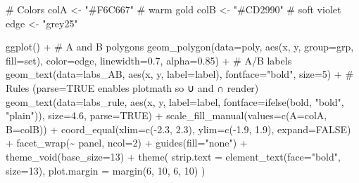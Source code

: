 \documentclass[
  letterpaper,
  DIV=11,
  numbers=noendperiod]{scrreprt}
\newenvironment{Shaded}{\begin{snugshade}}{\end{snugshade}}
\newcommand{\AttributeTok}[1]{\textcolor[rgb]{0.40,0.45,0.13}{#1}}
\newcommand{\CommentTok}[1]{\textcolor[rgb]{0.37,0.37,0.37}{#1}}
\newcommand{\ConstantTok}[1]{\textcolor[rgb]{0.56,0.35,0.01}{#1}}
\newcommand{\DecValTok}[1]{\textcolor[rgb]{0.68,0.00,0.00}{#1}}
\newcommand{\FloatTok}[1]{\textcolor[rgb]{0.68,0.00,0.00}{#1}}
\newcommand{\FunctionTok}[1]{\textcolor[rgb]{0.28,0.35,0.67}{#1}}
\newcommand{\NormalTok}[1]{\textcolor[rgb]{0.00,0.23,0.31}{#1}}
\newcommand{\OtherTok}[1]{\textcolor[rgb]{0.00,0.23,0.31}{#1}}
\newcommand{\SpecialCharTok}[1]{\textcolor[rgb]{0.37,0.37,0.37}{#1}}
\newcommand{\StringTok}[1]{\textcolor[rgb]{0.13,0.47,0.30}{#1}}
\begin{document}
\begin{Shaded}
\begin{Highlighting}[]
\CommentTok{\# Colors}
\NormalTok{colA }\OtherTok{\textless{}{-}} \StringTok{"\#F6C667"}  \CommentTok{\# warm gold}
\NormalTok{colB }\OtherTok{\textless{}{-}} \StringTok{"\#CD2990"}  \CommentTok{\# soft violet}
\NormalTok{edge }\OtherTok{\textless{}{-}} \StringTok{"grey25"}

\FunctionTok{ggplot}\NormalTok{() }\SpecialCharTok{+}
  \CommentTok{\# A and B polygons}
  \FunctionTok{geom\_polygon}\NormalTok{(}\AttributeTok{data=}\NormalTok{poly,}
               \FunctionTok{aes}\NormalTok{(x, y, }\AttributeTok{group=}\NormalTok{grp, }\AttributeTok{fill=}\NormalTok{set),}
               \AttributeTok{color=}\NormalTok{edge, }\AttributeTok{linewidth=}\FloatTok{0.7}\NormalTok{, }\AttributeTok{alpha=}\FloatTok{0.85}\NormalTok{) }\SpecialCharTok{+}
  \CommentTok{\# A/B labels}
  \FunctionTok{geom\_text}\NormalTok{(}\AttributeTok{data=}\NormalTok{labs\_AB, }\FunctionTok{aes}\NormalTok{(x, y, }\AttributeTok{label=}\NormalTok{label), }\AttributeTok{fontface=}\StringTok{"bold"}\NormalTok{, }\AttributeTok{size=}\DecValTok{5}\NormalTok{) }\SpecialCharTok{+}
  \CommentTok{\# Rules (parse=TRUE enables plotmath so ∪ and ∩ render)}
  \FunctionTok{geom\_text}\NormalTok{(}\AttributeTok{data=}\NormalTok{labs\_rule,}
            \FunctionTok{aes}\NormalTok{(x, y, }\AttributeTok{label=}\NormalTok{label, }\AttributeTok{fontface=}\FunctionTok{ifelse}\NormalTok{(bold, }\StringTok{"bold"}\NormalTok{, }\StringTok{"plain"}\NormalTok{)),}
            \AttributeTok{size=}\FloatTok{4.6}\NormalTok{, }\AttributeTok{parse=}\ConstantTok{TRUE}\NormalTok{) }\SpecialCharTok{+}
  \FunctionTok{scale\_fill\_manual}\NormalTok{(}\AttributeTok{values=}\FunctionTok{c}\NormalTok{(}\AttributeTok{A=}\NormalTok{colA, }\AttributeTok{B=}\NormalTok{colB)) }\SpecialCharTok{+}
  \FunctionTok{coord\_equal}\NormalTok{(}\AttributeTok{xlim=}\FunctionTok{c}\NormalTok{(}\SpecialCharTok{{-}}\FloatTok{2.3}\NormalTok{, }\FloatTok{2.3}\NormalTok{), }\AttributeTok{ylim=}\FunctionTok{c}\NormalTok{(}\SpecialCharTok{{-}}\FloatTok{1.9}\NormalTok{, }\FloatTok{1.9}\NormalTok{), }\AttributeTok{expand=}\ConstantTok{FALSE}\NormalTok{) }\SpecialCharTok{+}
  \FunctionTok{facet\_wrap}\NormalTok{(}\SpecialCharTok{\textasciitilde{}}\NormalTok{ panel, }\AttributeTok{ncol=}\DecValTok{2}\NormalTok{) }\SpecialCharTok{+}
  \FunctionTok{guides}\NormalTok{(}\AttributeTok{fill=}\StringTok{"none"}\NormalTok{) }\SpecialCharTok{+}
  \FunctionTok{theme\_void}\NormalTok{(}\AttributeTok{base\_size=}\DecValTok{13}\NormalTok{) }\SpecialCharTok{+}
  \FunctionTok{theme}\NormalTok{(}
    \AttributeTok{strip.text =} \FunctionTok{element\_text}\NormalTok{(}\AttributeTok{face=}\StringTok{"bold"}\NormalTok{, }\AttributeTok{size=}\DecValTok{13}\NormalTok{),}
    \AttributeTok{plot.margin =} \FunctionTok{margin}\NormalTok{(}\DecValTok{6}\NormalTok{, }\DecValTok{10}\NormalTok{, }\DecValTok{6}\NormalTok{, }\DecValTok{10}\NormalTok{)}
\NormalTok{  )}
\end{Highlighting}
\end{Shaded}
\end{document}

